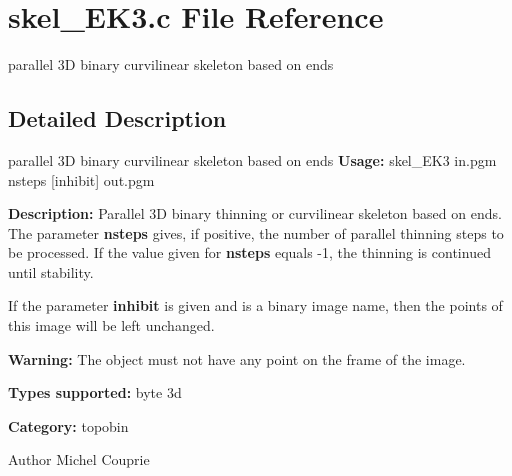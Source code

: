 \section{skel\_\-EK3.c File Reference}
\label{skel__EK3_8c}


parallel 3D binary curvilinear skeleton based on ends  




\subsection{Detailed Description}
parallel 3D binary curvilinear skeleton based on ends {\bfseries Usage:} skel\_\-EK3 in.pgm nsteps [inhibit] out.pgm

{\bfseries Description:} Parallel 3D binary thinning or curvilinear skeleton based on ends. The parameter {\bfseries nsteps} gives, if positive, the number of parallel thinning steps to be processed. If the value given for {\bfseries nsteps} equals -\/1, the thinning is continued until stability.

If the parameter {\bfseries inhibit} is given and is a binary image name, then the points of this image will be left unchanged.

{\bfseries Warning:} The object must not have any point on the frame of the image.

{\bfseries Types supported:} byte 3d

{\bfseries Category:} topobin

\begin{DoxyAuthor}{Author}
Michel Couprie 
\end{DoxyAuthor}
